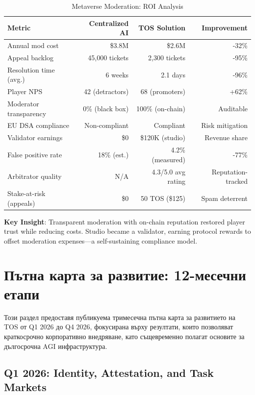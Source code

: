 \documentclass[11pt]{article}
\begin{document}
\begin{table}[H]
\centering
\caption{Metaverse Moderation: ROI Analysis}
\label{tab:metaverse-roi}
\begin{tabular}{@{}lrrr@{}}
\toprule
\textbf{Metric} & \textbf{Centralized AI} & \textbf{TOS Solution} & \textbf{Improvement} \\ \midrule
Annual mod cost & \$3.8M & \$2.6M & -32\% \\
Appeal backlog & 45,000 tickets & 2,300 tickets & -95\% \\
Resolution time (avg.) & 6 weeks & 2.1 days & -96\% \\
Player NPS & 42 (detractors) & 68 (promoters) & +62\% \\
Moderator transparency & 0\% (black box) & 100\% (on-chain) & Auditable \\
EU DSA compliance & Non-compliant & Compliant & Risk mitigation \\
Validator earnings & \$0 & \$120K (studio) & Revenue share \\
False positive rate & 18\% (est.) & 4.2\% (measured) & -77\% \\
Arbitrator quality & N/A & 4.3/5.0 avg rating & Reputation-tracked \\
Stake-at-risk (appeals) & \$0 & 50 TOS (\$125) & Spam deterrent \\
\bottomrule
\end{tabular}
\end{table}

\textbf{Key Insight}: Transparent moderation with on-chain reputation restored player trust while reducing costs. Studio became a validator, earning protocol rewards to offset moderation expenses—a self-sustaining compliance model.

\section{Пътна карта за развитие: 12-месечни етапи}
\label{sec:12month-roadmap}

Този раздел предоставя публикуема тримесечна пътна карта за развитието на TOS от Q1 2026 до Q4 2026, фокусирана върху резултати, които позволяват краткосрочно корпоративно внедряване, като същевременно полагат основите за дългосрочна AGI инфраструктура.

\subsection{Q1 2026: Identity, Attestation, and Task Markets}
\end{document}
